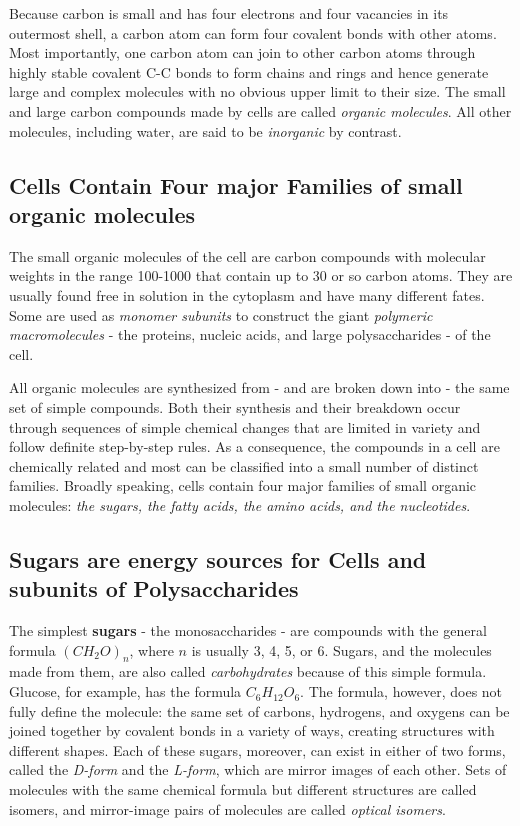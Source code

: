 Because carbon is small
and has four electrons and four vacancies in its outermost shell, a carbon
atom can form four covalent bonds with other atoms. Most importantly,
one carbon atom can join to other carbon atoms through highly stable
covalent C-C bonds to form chains and rings and hence generate large
and complex molecules with no obvious upper limit to their size.
The small and large carbon compounds made by
cells are called \textit{organic molecules}. All other molecules, including water,
are said to be \textit{inorganic} by contrast.

\subsection{Cells Contain Four major Families of small organic molecules}

The small organic molecules of the cell are carbon compounds with
molecular weights in the range 100-1000 that contain up to 30 or so carbon
atoms. They are usually found free in solution in the cytoplasm and
have many different fates. Some are used as \textit{monomer subunits} to construct
the giant \textit{polymeric macromolecules} - the proteins, nucleic acids,
and large polysaccharides - of the cell.

All organic molecules are synthesized from - and are broken down
into - the same set of simple compounds. Both their synthesis and their
breakdown occur through sequences of simple chemical changes that
are limited in variety and follow definite step-by-step rules. As a consequence,
the compounds in a cell are chemically related and most can be
classified into a small number of distinct families. Broadly speaking, cells
contain four major families of small organic molecules: \textit{the sugars, the
fatty acids, the amino acids, and the nucleotides}.

\subsection{Sugars are energy sources for Cells and subunits of Polysaccharides}

The simplest \textbf{sugars} - the monosaccharides - are compounds with the
general formula $(CH_{2}O)_{n}$, where $n$ is usually 3, 4, 5, or 6. Sugars, and
the molecules made from them, are also called \textit{carbohydrates} because
of this simple formula. Glucose, for example, has the formula $C_{6}H_{12}O_{6}$.
The formula, however, does not fully define the molecule:
the same set of carbons, hydrogens, and oxygens can be joined together
by covalent bonds in a variety of ways, creating structures with different
shapes.
Each of these sugars, moreover, can exist in either of two forms, called
the \textit{D-form} and the \textit{L-form}, which are mirror images of each other. Sets
of molecules with the same chemical formula but different structures are
called isomers, and mirror-image pairs of molecules are called \textit{optical isomers}.


